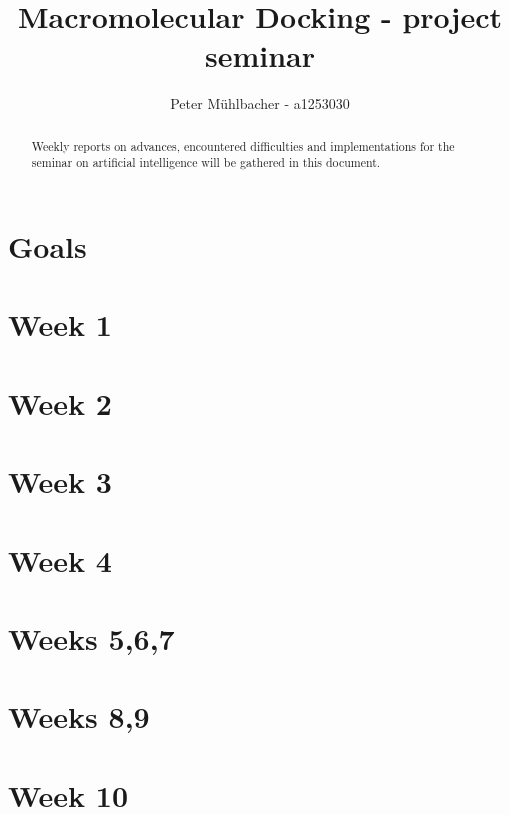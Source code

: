 \documentclass[12pt]{article}
\title{Macromolecular Docking - project seminar}
\author{Peter M\"uhlbacher - a1253030}
\theoremstyle{definition}\newtheorem*{definition}{Definition}
\theoremstyle{definition}\newtheorem*{remark}{Remark}
\begin{document}
\maketitle
\tableofcontents

\begin{abstract}
Weekly reports on advances, encountered difficulties and implementations for the seminar on artificial intelligence will be gathered in this document.
\end{abstract}

\section*{Goals}


\section{Week 1}


\section{Week 2}


\section{Week 3}


\section{Week 4}


\section{Weeks 5,6,7}


\section{Weeks 8,9}


\section{Week 10}




\end{document}
